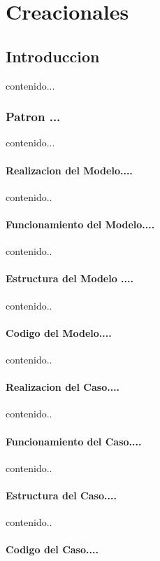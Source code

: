 \chapter{Creacionales}
\section{Introduccion}
contenido...
\newpage
\subsection{Patron ...}
contenido...

\subsubsection{Realizacion del Modelo....}
contenido..
\subsubsection{Funcionamiento del Modelo....}
contenido..
\subsubsection{Estructura del Modelo ....}
contenido..
\subsubsection{Codigo del  Modelo....}
contenido..
\subsubsection{Realizacion del Caso....}
contenido..
\subsubsection{Funcionamiento del Caso....}
contenido..
\subsubsection{Estructura del Caso....}
contenido..
\subsubsection{Codigo del  Caso....}
%



